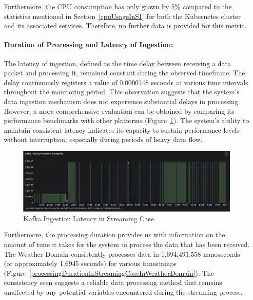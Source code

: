 \documentclass[journal]{IEEEtran}
\begin{document}
Furthermore, the CPU consumption has only grown by 5\% compared to the statistics mentioned in Section~\ref{cpuUsageInS1} for both the Kubernetes cluster and its associated services. Therefore, no further data is provided for this metric.

\paragraph{Duration of Processing and Latency of Ingestion:} The latency of ingestion, defined as the time delay between receiving a data packet and processing it, remained constant during the observed timeframe. The delay continuously registers a value of 0.0000148 seconds at various time intervals throughout the monitoring period. This observation suggests that the system's data ingestion mechanism does not experience substantial delays in processing. However, a more comprehensive evaluation can be obtained by comparing its performance benchmarks with other platforms (Figure~\ref{kafkaIngestionLatencyInStreamingCase}). The system's ability to maintain consistent latency indicates its capacity to sustain performance levels without interruption, especially during periods of heavy data flow.

\begin{figure}
  \centering
  \includegraphics[width=\textwidth]{images/kafka-ingestion-latency-sum-streaming-case.png}
  \caption{Kafka Ingestion Latency in Streaming Case}
  \label{kafkaIngestionLatencyInStreamingCase}
\end{figure}

Furthermore, the processing duration provides us with information on the amount of time it takes for the system to process the data that has been received. The Weather Domain consistently processes data in 1,694,491,558 nanoseconds (or approximately 1.6945 seconds) for various timestamps (Figure~\ref{processingDurationInStreamingCaseInWeatherDomain}). The consistency seen suggests a reliable data processing method that remains unaffected by any potential variables encountered during the streaming process.
\end{document}
